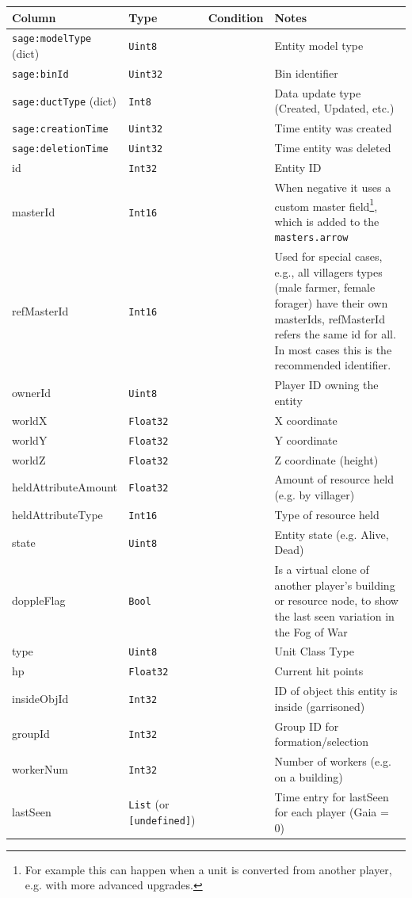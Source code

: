 \begin{longtable}{@{}p{}p{}p{}p{}@{}}
  \toprule
  Column & Type & Condition & Notes \\
  \midrule
  \endhead
  \texttt{sage:modelType} (dict) & \texttt{Uint8} & & Entity model type \\
  \texttt{sage:binId} & \texttt{Uint32} & & Bin identifier \\
  \texttt{sage:ductType} (dict) & \texttt{Int8} & & Data update type (Created, Updated, etc.) \\
  \texttt{sage:creationTime} & \texttt{Uint32} & & Time entity was created \\
  \texttt{sage:deletionTime} & \texttt{Uint32} & & Time entity was deleted \\
  id & \texttt{Int32} & & Entity ID \\
  masterId & \texttt{Int16} & & When negative it uses a custom master field\footnote{For example this can happen when a unit is converted from another player, e.g. with more advanced upgrades.}, which is added to the \texttt{masters.arrow} \\
  refMasterId & \texttt{Int16} & & Used for special cases, e.g., all villagers types (male farmer, female forager) have their own masterIds, refMasterId refers the same id for all. In most cases this is the recommended identifier. \\
  ownerId & \texttt{Uint8} & & Player ID owning the entity \\
  worldX & \texttt{Float32} & & X coordinate \\
  worldY & \texttt{Float32} & & Y coordinate \\
  worldZ & \texttt{Float32} & & Z coordinate (height) \\
  heldAttributeAmount & \texttt{Float32} & & Amount of resource held (e.g. by villager) \\
  heldAttributeType & \texttt{Int16} & & Type of resource held \\
  state & \texttt{Uint8} & & Entity state (e.g. Alive, Dead) \\
  doppleFlag & \texttt{Bool} & & Is a virtual clone of another player's building or resource node, to show the last seen variation in the Fog of War \\
  type & \texttt{Uint8} & & Unit Class Type \\
  hp & \texttt{Float32} & & Current hit points \\
  insideObjId & \texttt{Int32} & & ID of object this entity is inside (garrisoned) \\
  groupId & \texttt{Int32} & & Group ID for formation/selection \\
  workerNum & \texttt{Int32} & & Number of workers (e.g. on a building) \\
  lastSeen & \texttt{List} (or \texttt{[undefined]}) & & Time entry for lastSeen for each player (Gaia = 0) \\
  \bottomrule
\end{longtable}

